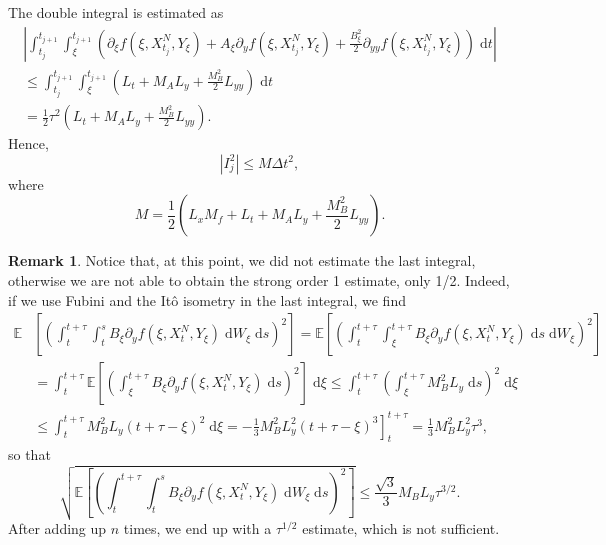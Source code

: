 \documentclass[reqno,12pt]{amsart}
\theoremstyle{plain}%
\theoremstyle{definition}
\newtheorem{rmk}{Remark}[section]
\begin{document}
The double integral is estimated as
\begin{multline}
   \left|  \int_{t_j}^{t_{j+1}}  \int_\xi^{t_{j+1}} \left(\partial_\xi f(\xi, X_{t_j}^N, Y_\xi) + A_\xi \partial_y f(\xi, X_{t_j}^N, Y_\xi)  + \frac{B_\xi^2}{2}\partial_{yy}f(\xi, X_{t_j}^N, Y_\xi) \right) \;\mathrm{d}t \right| \\
   \leq \int_{t_j}^{t_{j+1}}  \int_\xi^{t_{j+1}} \left(L_t + M_A L_y  + \frac{M_B^2}{2}L_{yy} \right) \;\mathrm{d}t \\
   = \frac{1}{2}\tau^2\left(L_t + M_A L_y  + \frac{M_B^2}{2}L_{yy} \right).
\end{multline}
Hence,
\begin{equation}
\label{I2estimate}
\left| I_j^2 \right| \leq M\Delta t^2,
\end{equation}
where
$$
M = \frac{1}{2}\left(L_x M_f + L_t + M_A L_y  + \frac{M_B^2}{2}L_{yy} \right).
$$

\begin{rmk}\tiny
Notice that, at this point, we did not estimate the last integral, otherwise we are not able to obtain the strong order 1 estimate, only 1/2. Indeed, if we use Fubini and the It\^o isometry in the last integral, we find
\begin{align*}
  \mathbb{E} & \left[ \left( \int_t^{t + \tau} \int_t^s B_\xi \partial_y f(\xi, X_t^N, Y_\xi)\;\mathrm{d}W_\xi\;\mathrm{d}s \right)^2\right] = \mathbb{E} \left[ \left( \int_t^{t + \tau} \int_\xi^{t+\tau} B_\xi \partial_y f(\xi, X_t^N, Y_\xi) \;\mathrm{d}s\;\mathrm{d}W_\xi \right)^2\right] \\
  & = \int_t^{t + \tau} \mathbb{E} \left[ \left( \int_\xi^{t+\tau} B_\xi \partial_y f(\xi, X_t^N, Y_\xi) \;\mathrm{d}s \right)^2\right] \;\mathrm{d}\xi  \leq  \int_t^{t + \tau}  \left( \int_\xi^{t+\tau} M_B^2 L_y \;\mathrm{d}s \right)^2\;\mathrm{d}\xi \\
  & \leq  \int_t^{t + \tau}  M_B^2 L_y (t + \tau - \xi)^2\;\mathrm{d}\xi  = \left. - \frac{1}{3} M_B^2 L_y^2 (t + \tau - \xi)^3 \right]_t^{t+\tau}  = \frac{1}{3} M_B^2 L_y^2 \tau^3,
\end{align*}
so that
\begin{equation}
\sqrt{\mathbb{E} \left[ \left( \int_t^{t + \tau} \int_t^s B_\xi \partial_y f(\xi, X_t^N, Y_\xi)\;\mathrm{d}W_\xi\;\mathrm{d}s \right)^2\right]} \leq \frac{\sqrt{3}}{3} M_B L_y \tau^{3/2}.
\end{equation}
After adding up $n$ times, we end up with a $\tau^{1/2}$ estimate, which is not sufficient.
\end{rmk}
\end{document}
